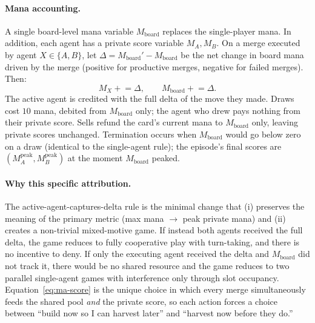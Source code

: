 \documentclass[11pt]{article}
\begin{document}
\paragraph{Mana accounting.} A single board-level mana variable
$M_\text{board}$ replaces the single-player mana. In addition, each agent
has a private score variable $M_A, M_B$. On a merge executed by agent
$X \in \{A, B\}$, let $\Delta = M_\text{board}' - M_\text{board}$ be the
net change in board mana driven by the merge (positive for productive
merges, negative for failed merges). Then:
\begin{equation}
\label{eq:ma-score}
M_X \mathrel{+}= \Delta, \qquad M_\text{board} \mathrel{+}= \Delta.
\end{equation}
The active agent is credited with the full delta of the move they made.
Draws cost $10$ mana, debited from $M_\text{board}$ only; the agent who
drew pays nothing from their private score. Sells refund the card's
current mana to $M_\text{board}$ only, leaving private scores unchanged.
Termination occurs when $M_\text{board}$ would go below zero on a draw
(identical to the single-agent rule); the episode's final scores are
$(M_A^{\text{peak}}, M_B^{\text{peak}})$ at the moment $M_\text{board}$
peaked.

\paragraph{Why this specific attribution.} The active-agent-captures-delta
rule is the minimal change that (i) preserves the meaning of the primary
metric (max mana $\to$ peak private mana) and (ii) creates a non-trivial
mixed-motive game. If instead both agents received the full delta, the
game reduces to fully cooperative play with turn-taking, and there is no
incentive to deny. If only the executing agent received the delta and
$M_\text{board}$ did not track it, there would be no shared resource and
the game reduces to two parallel single-agent games with interference
only through slot occupancy. Equation~\ref{eq:ma-score} is the unique
choice in which every merge simultaneously feeds the shared pool
\emph{and} the private score, so each action forces a choice between
``build now so I can harvest later'' and ``harvest now before they
do.''
\end{document}
